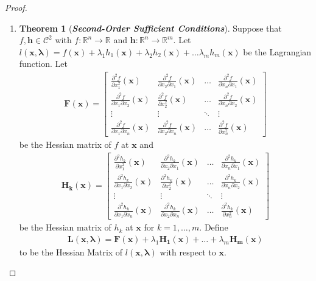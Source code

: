 \documentclass[12pt]{article}
\theoremstyle{definition}
\newcommand{\vc}[1]{\boldsymbol{#1}}
\newtheorem{theorem}{Theorem}
\begin{document}
\begin{proof}
\begin{enumerate}
    \item \begin{theorem}[\emph{\textbf{Second-Order Sufficient Conditions}}]
        Suppose that $f, \vc{h} \in \mathcal{C}^2$ with $f:\mathbb{R}^n \to \mathbb{R}$
        and $\vc{h}:\mathbb{R}^n \to \mathbb{R}^m$. Let $l(\vc{x},\vc{\lambda}) = f(\vc{x}) + \lambda_1 h_1(\vc{x}) + \lambda_2 h_2(\vc{x}) + \dots \lambda_m h_m(\vc{x})$
        be the Lagrangian function. Let
        \begin{align*}
          \vc{F}(\vc{x}) =
          \begin{bmatrix}
            \frac{\partial^2 f}{\partial x_1^2}(\vc{x}) & \frac{\partial^2 f}{\partial x_2 \partial x_1}(\vc{x}) & \dots & \frac{\partial^2 f}{\partial x_n \partial x_1}(\vc{x}) \\
            \frac{\partial^2 f}{\partial x_1 \partial x_2}(\vc{x}) & \frac{\partial^2 f}{\partial x_2^2}(\vc{x}) & \dots & \frac{\partial^2 f}{\partial x_n \partial x_2}(\vc{x}) \\
            \vdots & \vdots & \ddots & \vdots \\
            \frac{\partial^2 f}{\partial x_1 \partial x_n}(\vc{x}) & \frac{\partial^2 f}{\partial x_2 \partial x_n}(\vc{x}) & \dots & \frac{\partial^2 f}{\partial x_n^2}(\vc{x})
          \end{bmatrix}
        \end{align*}
        be the Hessian matrix of $f$ at $\vc{x}$ and
        \begin{align*}
          \vc{H_k}(\vc{x}) =
          \begin{bmatrix}
            \frac{\partial^2 h_k}{\partial x_1^2}(\vc{x}) & \frac{\partial^2 h_k}{\partial x_2 \partial x_1}(\vc{x}) & \dots & \frac{\partial^2 h_k}{\partial x_n \partial x_1}(\vc{x}) \\
            \frac{\partial^2 h_k}{\partial x_1 \partial x_2}(\vc{x}) & \frac{\partial^2 h_k}{\partial x_2^2}(\vc{x}) & \dots & \frac{\partial^2 h_k}{\partial x_n \partial x_2}(\vc{x}) \\
            \vdots & \vdots & \ddots & \vdots \\
            \frac{\partial^2 h_k}{\partial x_1 \partial x_n}(\vc{x}) & \frac{\partial^2 h_k}{\partial x_2 \partial x_n}(\vc{x}) & \dots & \frac{\partial^2 h_k}{\partial x_n^2}(\vc{x})
          \end{bmatrix}
        \end{align*}
        be the Hessian matrix of $h_k$ at $\vc{x}$ for $k=1,\dots,m$. Define
        \begin{align*}
          \vc{L}(\vc{x},\vc{\lambda}) = \vc{F}(\vc{x}) + \lambda_1 \vc{H_1}(\vc{x}) + \dots + \lambda_m \vc{H_m}(\vc{x})
        \end{align*}
        to be the Hessian Matrix of $l(\vc{x}, \vc{\lambda})$ with respect to $\vc{x}$.


\end{theorem}
\end{enumerate}
\end{proof}
\end{document}
